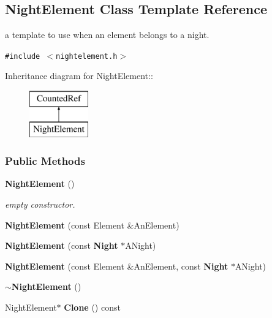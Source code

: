\subsection{Night\-Element  Class Template Reference}
\label{class_nightelement}
a template to use when an element belongs to a night. 


{\tt \#include $<$nightelement.h$>$}

Inheritance diagram for Night\-Element::\begin{figure}[H]
\begin{center}
\leavevmode
\includegraphics[height=2cm]{class_nightelement}
\end{center}
\end{figure}
\subsubsection*{Public Methods}
\begin{CompactItemize}
\item 
{}
{\bf Night\-Element} ()\label{class_nightelement_a0}

\begin{CompactList}\small\item\em empty constructor.\item\end{CompactList}\item 
{}
{\bf Night\-Element} (const Element \&An\-Element)\label{class_nightelement_a1}

\item 
{}
{\bf Night\-Element} (const {\bf Night} $\ast$ANight)\label{class_nightelement_a2}

\item 
{}
{\bf Night\-Element} (const Element \&An\-Element, const {\bf Night} $\ast$ANight)\label{class_nightelement_a3}

\item 
{}
{\bf $\sim$Night\-Element} ()\label{class_nightelement_a4}

\item 
{}
Night\-Element$\ast$ {\bf Clone} () const\label{class_nightelement_a5}

\end{CompactItemize}

